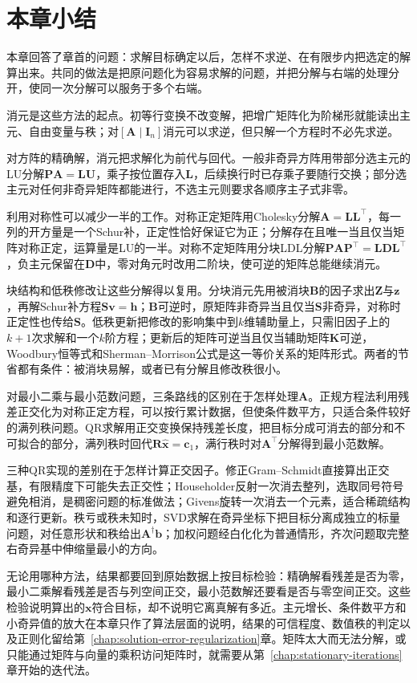 \FloatBarrier
\section{本章小结}
\label{sec:direct-methods-summary}

本章回答了章首的问题：求解目标确定以后，怎样不求逆、在有限步内把选定的解算出来。共同的做法是把原问题化为容易求解的问题，并把分解与右端的处理分开，使同一次分解可以服务于多个右端。

消元是这些方法的起点。初等行变换不改变解，把增广矩阵化为阶梯形就能读出主元、自由变量与秩；对$[\bm A\mid\bm I_n]$消元可以求逆，但只解一个方程时不必先求逆。

对方阵的精确解，消元把求解化为前代与回代。一般非奇异方阵用带部分选主元的LU分解$\bm P\bm A=\bm L\bm U$，乘子按位置存入$\bm L$，后续换行时已存乘子要随行交换；部分选主元对任何非奇异矩阵都能进行，不选主元则要求各顺序主子式非零。

利用对称性可以减少一半的工作。对称正定矩阵用Cholesky分解$\bm A=\bm L\bm L^\top$，每一列的开方量是一个Schur补，正定性恰好保证它为正；分解存在且唯一当且仅当矩阵对称正定，运算量是LU的一半。对称不定矩阵用分块LDL分解$\bm P\bm A\bm P^\top=\bm L\bm D\bm L^\top$，负主元保留在$\bm D$中，零对角元时改用二阶块，使可逆的矩阵总能继续消元。

块结构和低秩修改让这些分解得以复用。分块消元先用被消块$\bm B$的因子求出$\bm Z$与$\bm z$，再解Schur补方程$\bm S\bm v=\bm h$；$\bm B$可逆时，原矩阵非奇异当且仅当$\bm S$非奇异，对称时正定性也传给$\bm S$。低秩更新把修改的影响集中到$k$维辅助量上，只需旧因子上的$k+1$次求解和一个$k$阶方程；更新后的矩阵可逆当且仅当辅助矩阵$\bm K$可逆，Woodbury恒等式和Sherman--Morrison公式是这一等价关系的矩阵形式。两者的节省都有条件：被消块易解，或者已有分解且修改秩很小。

对最小二乘与最小范数问题，三条路线的区别在于怎样处理$\bm A$。正规方程法利用残差正交化为对称正定方程，可以按行累计数据，但使条件数平方，只适合条件较好的满列秩问题。QR求解用正交变换保持残差长度，把目标分成可消去的部分和不可拟合的部分，满列秩时回代$\bm R\hat{\bm x}=\bm c_1$，满行秩时对$\bm A^\top$分解得到最小范数解。

三种QR实现的差别在于怎样计算正交因子。修正Gram--Schmidt直接算出正交基，有限精度下可能失去正交性；Householder反射一次消去整列，选取同号符号避免相消，是稠密问题的标准做法；Givens旋转一次消去一个元素，适合稀疏结构和逐行更新。秩亏或秩未知时，SVD求解在奇异坐标下把目标分离成独立的标量问题，对任意形状和秩给出$\bm A^\dagger\bm b$；加权问题经白化化为普通情形，齐次问题取完整右奇异基中伸缩量最小的方向。

无论用哪种方法，结果都要回到原始数据上按目标检验：精确解看残差是否为零，最小二乘解看残差是否与列空间正交，最小范数解还要看是否与零空间正交。这些检验说明算出的$\bm x$符合目标，却不说明它离真解有多近。主元增长、条件数平方和小奇异值的放大在本章只作了算法层面的说明，结果的可信程度、数值秩的判定以及正则化留给第~\ref{chap:solution-error-regularization}章。矩阵太大而无法分解，或只能通过矩阵与向量的乘积访问矩阵时，就需要从第~\ref{chap:stationary-iterations}章开始的迭代法。
